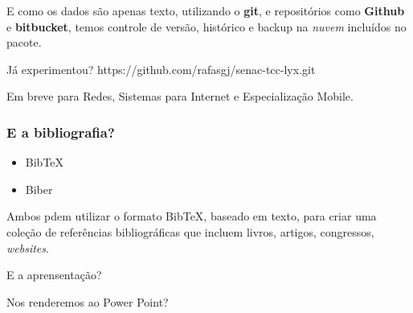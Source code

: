 \documentclass[aspectratio=43,14pt]{beamer}
\begin{document}
\begin{frame}
        \vspace{2cm}
        E como os dados são apenas texto, utilizando o \textbf{git}, e repositórios
        como \textbf{Github} e \textbf{bitbucket}, temos controle de versão, histórico
        e backup na \emph{nuvem} incluídos no pacote.
\end{frame}

\begin{frame}
    \begin{center}
    \vfill
    Já experimentou?
    \vfill
    \large{https://github.com/rafasgj/senac-tcc-lyx.git}
    \vfill
    \end{center}
    \tiny \color{gray} Em breve para Redes, Sistemas para Internet e Especialização Mobile.
\end{frame}

\begin{frame}
    \frametitle{E a bibliografia?}
    \begin{itemize}
        \item{BibTeX}
        \item{Biber}
    \end{itemize}

    Ambos pdem utilizar o formato BibTeX, baseado em texto, para criar uma coleção
    de referências bibliográficas que incluem livros, artigos, congressos, \emph{websites}.
\end{frame}

{%
    \begin{frame}[t]
        \color{white} \huge E a aprensentação?
    \end{frame}
}

\begin{frame}
    \begin{center}
    \Huge Nos renderemos ao Power Point?
    \end{center}
\end{frame}
\end{document}
